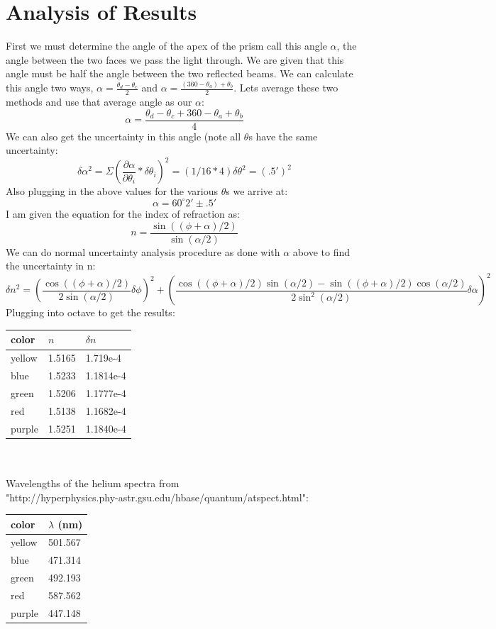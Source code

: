 \documentclass[12pt,a4paper]{article}
\begin{document}
\section{Analysis of Results}
First we must determine the angle of the apex of the prism call this angle $\alpha$, the angle between the two faces we pass the light through.  We are given that this angle must be half the angle between the two reflected beams.  We can calculate this angle two ways, $\alpha=\frac{\theta_d-\theta_c}{2}$ and $\alpha=\frac{(360-\theta_a)+\theta_b}{2}$.  Lets average these two methods and use that average angle as our $\alpha$:
\[\alpha=\frac{\theta_d-\theta_c+360-\theta_a+\theta_b}{4}\]
We can also get the uncertainty in this angle (note all $\theta$s have the same uncertainty:
\[\delta\alpha^2=\Sigma(\frac{\partial\alpha}{\partial\theta_i}*\delta\theta_i)^2=(1/16*4)\delta\theta^2=(.5')^2\]
Also plugging in the above values for the various $\theta$s we arrive at:
\[\alpha=60^\circ 2'\pm .5'\]
I am given the equation for the index of refraction as:
\[n=\frac{\sin((\phi+\alpha)/2)}{\sin(\alpha/2)}\]
We can do normal uncertainty analysis procedure as done with $\alpha$ above to find the uncertainty in n:
\[\delta n^2=(\frac{\cos((\phi+\alpha)/2)}{2\sin(\alpha/2)}\delta\phi)^2+(\frac{\cos((\phi+\alpha)/2)\sin(\alpha/2)-\sin((\phi+\alpha)/2)\cos(\alpha/2)}{2\sin^2(\alpha/2)}\delta\alpha)^2\]
Plugging into octave to get the results:\\
\begin{tabular}{| l | l | l |}
\hline
color & $n$ & $\delta n$\\
\hline
yellow & 1.5165 & 1.719e-4\\
\hline
blue & 1.5233 & 1.1814e-4\\
\hline
green & 1.5206 & 1.1777e-4\\
\hline
red & 1.5138 & 1.1682e-4\\
\hline
purple & 1.5251 & 1.1840e-4\\
\hline


\end{tabular}\\\\
Wavelengths of the helium spectra from \\
"http://hyperphysics.phy-astr.gsu.edu/hbase/quantum/atspect.html":\\
\begin{tabular}{| l | l |}
\hline
color & $\lambda$ (nm)\\
\hline
yellow & 501.567\\
\hline
blue & 471.314\\
\hline
green & 492.193\\
\hline
red & 587.562\\
\hline
purple & 447.148\\
\hline




\end{tabular}\\\\\\\\\\
\end{document}
